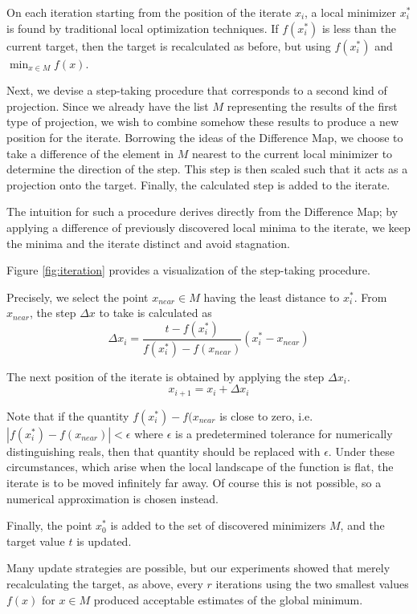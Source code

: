\documentclass[12pt]{article}
\begin{document}
On each iteration starting from the position of the iterate $x_i$, a local
minimizer $x_i^*$ is found by traditional local optimization techniques.
If $f(x_i^*)$ is less than the current target, then the target is
recalculated as before, but using $f(x_i^*)$ and $\min_{x \in M} f(x)$.

Next, we devise a step-taking procedure that corresponds to a second kind
of projection. Since we already have the list $M$ representing the results of
the first type of projection, we wish to combine somehow these results to
produce a new position for the iterate. Borrowing the ideas of the Difference
Map, we choose to take a difference of the element in $M$ nearest to the
current local minimizer to determine the direction of the step. This step is
then scaled such that it acts as a projection onto the target. Finally, the
calculated step is added to the iterate.

The intuition for such a procedure derives directly from the Difference Map;
by applying a difference of previously discovered local minima to the iterate,
we keep the minima and the iterate distinct and avoid stagnation.

Figure \ref{fig:iteration} provides a visualization of the step-taking
procedure.

Precisely, we select the point $x_{near} \in M$ having the least distance to
$x_i^*$.
From $x_{near}$, the step $\Delta x$ to take is calculated as
\begin{equation*}
    \Delta x_i =
        \frac{t - f(x_i^*)}{f(x_i^*) - f(x_{near})} (x_i^* - x_{near})
    \label{eqn:dx}
\end{equation*}

The next position of the iterate is obtained by applying the step
$\Delta x_i$.
$$
    x_{i+1} = x_i + \Delta x_i
$$

Note that if the quantity $f(x_i^*) - f(x_{near}$ is close to zero, i.e.
$|f(x_i^*) - f(x_{near})| < \epsilon$ where $\epsilon$ is a predetermined
tolerance for numerically distinguishing reals, then that quantity should be
replaced with $\epsilon$.
Under these circumstances, which arise when the local landscape of the
function is flat, the iterate is to be moved infinitely far away.
Of course this is not possible, so a numerical approximation is chosen
instead.

Finally, the point $x_0^*$ is added to the set of discovered minimizers
$M$, and the target value $t$ is updated.

Many update strategies are possible, but our experiments showed that merely
recalculating the target, as above, every $r$ iterations using the two
smallest values $f(x)$ for $x \in M$ produced acceptable estimates of the
global minimum.
\end{document}
